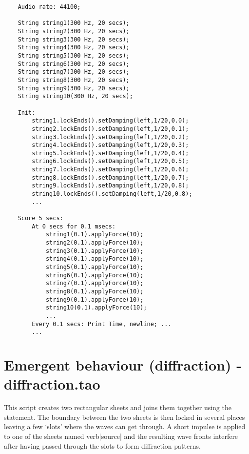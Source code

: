 \begin{verbatim}
    Audio rate: 44100;
        
    String string1(300 Hz, 20 secs);
    String string2(300 Hz, 20 secs);
    String string3(300 Hz, 20 secs);
    String string4(300 Hz, 20 secs);
    String string5(300 Hz, 20 secs);
    String string6(300 Hz, 20 secs);
    String string7(300 Hz, 20 secs);
    String string8(300 Hz, 20 secs);
    String string9(300 Hz, 20 secs);
    String string10(300 Hz, 20 secs);
        
    Init:
        string1.lockEnds().setDamping(left,1/20,0.0);
        string2.lockEnds().setDamping(left,1/20,0.1);
        string3.lockEnds().setDamping(left,1/20,0.2);
        string4.lockEnds().setDamping(left,1/20,0.3);
        string5.lockEnds().setDamping(left,1/20,0.4);
        string6.lockEnds().setDamping(left,1/20,0.5);
        string7.lockEnds().setDamping(left,1/20,0.6);
        string8.lockEnds().setDamping(left,1/20,0.7);
        string9.lockEnds().setDamping(left,1/20,0.8);
        string10.lockEnds().setDamping(left,1/20,0.8);
        ...
        
    Score 5 secs:
        At 0 secs for 0.1 msecs:
            string1(0.1).applyForce(10);
            string2(0.1).applyForce(10);
            string3(0.1).applyForce(10);
            string4(0.1).applyForce(10);
            string5(0.1).applyForce(10);
            string6(0.1).applyForce(10);
            string7(0.1).applyForce(10);
            string8(0.1).applyForce(10);
            string9(0.1).applyForce(10);
            string10(0.1).applyForce(10);
            ...
        Every 0.1 secs: Print Time, newline; ...
        ...
\end{verbatim}
 
\section{Emergent behaviour (diffraction) - diffraction.tao}
This script creates two rectangular sheets and joins them together using
the  statement. The boundary between the two sheets is then
locked in several places leaving a few `slots' where the waves can get through.
A short impulse is applied to one of the sheets named verb|source|
and the resulting wave fronts interfere after having passed through the
slots to form diffraction patterns.

